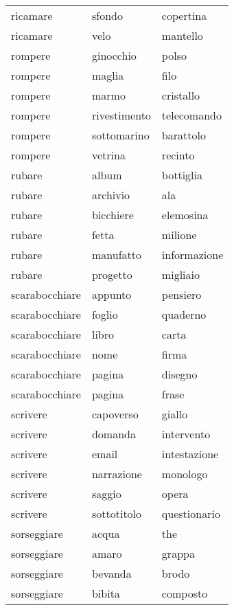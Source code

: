 \begin{longtable}{l|ll}
ricamare       & sfondo        & copertina    \\
ricamare       & velo          & mantello     \\
rompere        & ginocchio     & polso        \\
rompere        & maglia        & filo         \\
rompere        & marmo         & cristallo    \\
rompere        & rivestimento  & telecomando  \\
rompere        & sottomarino   & barattolo    \\
rompere        & vetrina       & recinto      \\
rubare         & album         & bottiglia    \\
rubare         & archivio      & ala          \\
rubare         & bicchiere     & elemosina    \\
rubare         & fetta         & milione      \\
rubare         & manufatto     & informazione \\
rubare         & progetto      & migliaio     \\
scarabocchiare & appunto       & pensiero     \\
scarabocchiare & foglio        & quaderno     \\
scarabocchiare & libro         & carta        \\
scarabocchiare & nome          & firma        \\
scarabocchiare & pagina        & disegno      \\
scarabocchiare & pagina        & frase        \\
scrivere       & capoverso     & giallo       \\
scrivere       & domanda       & intervento   \\
scrivere       & email         & intestazione \\
scrivere       & narrazione    & monologo     \\
scrivere       & saggio        & opera        \\
scrivere       & sottotitolo   & questionario \\
sorseggiare    & acqua         & the          \\
sorseggiare    & amaro         & grappa       \\
sorseggiare    & bevanda       & brodo        \\
sorseggiare    & bibita        & composto     \\

\end{longtable}
